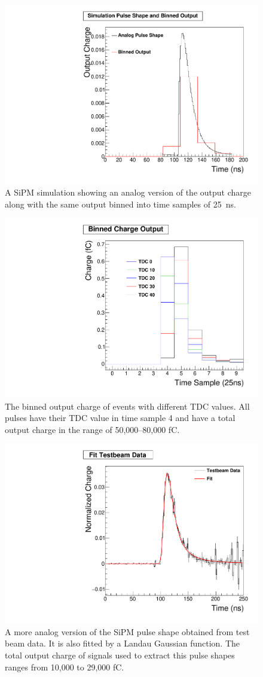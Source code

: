\begin{figure}
\centering
\includegraphics[width=0.6\linewidth]{Figures/Bin.pdf}
\caption{A SiPM simulation showing an analog version of the output charge along with the same output binned into time samples of 25~ns.}
\label{fig:bin}
\end{figure}

\begin{figure}
\centering
\includegraphics[width=0.6\linewidth]{Figures/Phase.pdf}
\caption{The binned output charge of events with different TDC values. All pulses have their TDC value in time sample 4 and have a total output charge in the range of 50,000--80,000 fC.}
\label{fig:Phase}
\end{figure}

\begin{figure}
\centering
\includegraphics[width=0.6\linewidth]{Figures/FittedPlot.pdf}
\caption{A more analog version of the SiPM pulse shape obtained from test beam data. It is also fitted by a Landau Gaussian function. The total output charge of signals used to extract this pulse shapes ranges from 10,000 to 29,000 fC.}
\label{fig:fit}
\end{figure}


